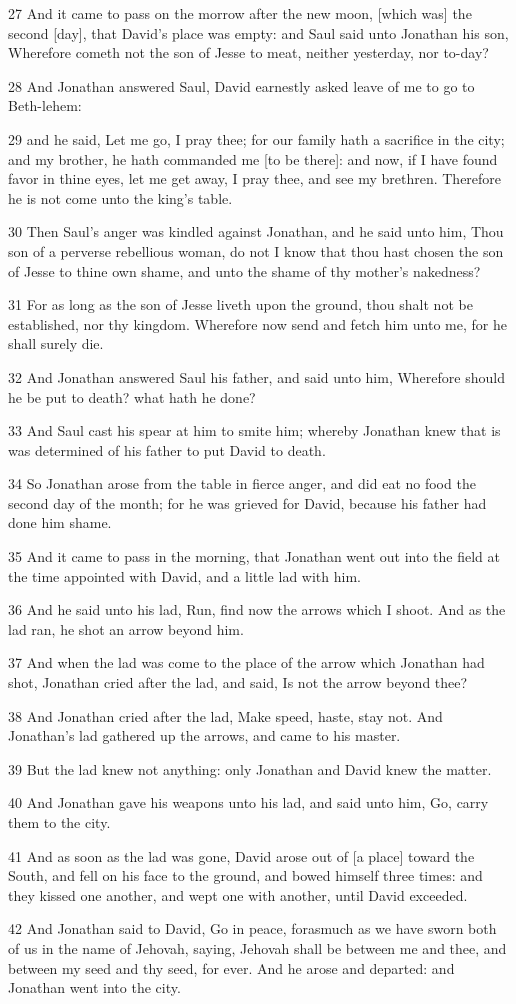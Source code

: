 \par 27 And it came to pass on the morrow after the new moon, [which was] the second [day], that David's place was empty: and Saul said unto Jonathan his son, Wherefore cometh not the son of Jesse to meat, neither yesterday, nor to-day?
\par 28 And Jonathan answered Saul, David earnestly asked leave of me to go to Beth-lehem:
\par 29 and he said, Let me go, I pray thee; for our family hath a sacrifice in the city; and my brother, he hath commanded me [to be there]: and now, if I have found favor in thine eyes, let me get away, I pray thee, and see my brethren. Therefore he is not come unto the king's table.
\par 30 Then Saul's anger was kindled against Jonathan, and he said unto him, Thou son of a perverse rebellious woman, do not I know that thou hast chosen the son of Jesse to thine own shame, and unto the shame of thy mother's nakedness?
\par 31 For as long as the son of Jesse liveth upon the ground, thou shalt not be established, nor thy kingdom. Wherefore now send and fetch him unto me, for he shall surely die.
\par 32 And Jonathan answered Saul his father, and said unto him, Wherefore should he be put to death? what hath he done?
\par 33 And Saul cast his spear at him to smite him; whereby Jonathan knew that is was determined of his father to put David to death.
\par 34 So Jonathan arose from the table in fierce anger, and did eat no food the second day of the month; for he was grieved for David, because his father had done him shame.
\par 35 And it came to pass in the morning, that Jonathan went out into the field at the time appointed with David, and a little lad with him.
\par 36 And he said unto his lad, Run, find now the arrows which I shoot. And as the lad ran, he shot an arrow beyond him.
\par 37 And when the lad was come to the place of the arrow which Jonathan had shot, Jonathan cried after the lad, and said, Is not the arrow beyond thee?
\par 38 And Jonathan cried after the lad, Make speed, haste, stay not. And Jonathan's lad gathered up the arrows, and came to his master.
\par 39 But the lad knew not anything: only Jonathan and David knew the matter.
\par 40 And Jonathan gave his weapons unto his lad, and said unto him, Go, carry them to the city.
\par 41 And as soon as the lad was gone, David arose out of [a place] toward the South, and fell on his face to the ground, and bowed himself three times: and they kissed one another, and wept one with another, until David exceeded.
\par 42 And Jonathan said to David, Go in peace, forasmuch as we have sworn both of us in the name of Jehovah, saying, Jehovah shall be between me and thee, and between my seed and thy seed, for ever. And he arose and departed: and Jonathan went into the city.

